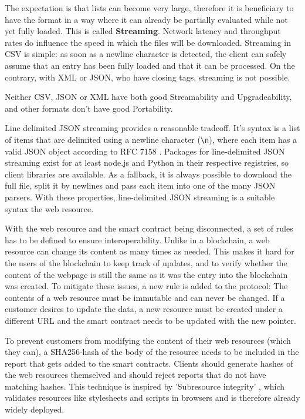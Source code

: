 The expectation is that lists can become very large, therefore it is beneficiary to have the format in a way where it can already be partially evaluated while not yet fully loaded. This is called \textbf{Streaming}. Network latency and throughput rates do influence the speed in which the files will be downloaded.
Streaming in CSV is simple: as soon as a newline character is detected, the client can safely assume that an entry has been fully loaded and that it can be processed. On the contrary, with XML or JSON, who have closing tags, streaming is not possible.

Neither CSV, JSON or XML have both good Streamability and Upgradeability, and other formats don't have good Portability.

Line delimited JSON streaming \cite{LineDelimitedJSON} provides a reasonable tradeoff. It's syntax is a list of items that are delimited using a newline character (\texttt{{\textbackslash}n}), where each item has a valid JSON object according to RFC 7158 \cite{RFC7158}. Packages for line-delimited JSON streaming exist for at least node.js and Python in their respective registries, so client libraries are available. As a fallback, it is always possible to download the full file, split it by newlines and pass each item into one of the many JSON parsers.
With these properties, line-delimited JSON streaming is a suitable syntax the web resource.

With the web resource and the smart contract being disconnected, a set of rules has to be defined to ensure interoperability. Unlike in a blockchain, a web resource can change its content as many times as needed. This makes it hard for the users of the blockchain to keep track of updates, and to verify whether the content of the webpage is still the same as it was the entry into the blockchain was created. To mitigate these issues, a new rule is added to the protocol: The contents of a web resource must be immutable and can never be changed. If a customer desires to update the data, a new resource must be created under a different URL and the smart contract needs to be updated with the new pointer.

To prevent customers from modifying the content of their web resources (which they can), a SHA256-hash of the body of the resource needs to be included in the report that gets added to the smart contracts. Clients should generate hashes of the web resources themselved and should reject reports that do not have matching hashes.
This technique is inspired by 'Subresource integrity' \cite{SubresourceIntegrity}, which validates resources like stylesheets and scripts in browsers and is therefore already widely deployed.

